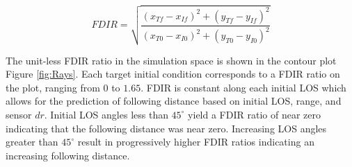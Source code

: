 \documentclass[conference]{IEEEtran}
\begin{document}




\begin{equation} 
\label{eq:FDIR}
FDIR = \sqrt{\frac{(x_{Tf}-x_{If})^2+(y_{Tf}-y_{If})^2}{(x_{T0}-x_{I0})^2+(y_{T0}-y_{I0})^2}}
\end{equation}

The unit-less FDIR ratio in the simulation space is shown in the contour plot Figure \ref{fig:Rays}. Each target initial condition corresponds to a FDIR ratio on the plot, ranging from $0$ to $1.65$. FDIR is constant along each initial LOS which allows for the prediction of following distance based on initial LOS, range, and sensor $dr$. Initial LOS angles less than $45^{\circ}$ yield a FDIR ratio of near zero indicating that the following distance was near zero. Increasing LOS angles greater than $45^{\circ}$ result in progressively higher FDIR ratios indicating an increasing following distance.
\end{document}
